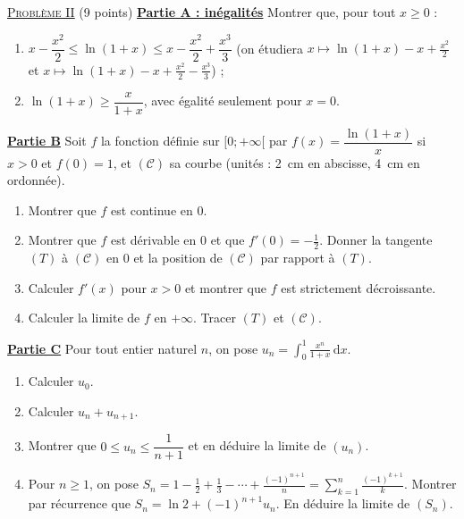 \noindent \underline{\textsc{Probl\`eme II}} (9 points) \newline
\underline{\textbf{Partie A : in\'egalit\'es}} \newline
Montrer que, pour tout $x \geq 0$ :
\begin{enumerate}
      \item $x - \dfrac{x^2}{2} \leq \ln(1 + x) \leq x - \dfrac{x^2}{2} + \dfrac{x^3}{3}$
            (on \'etudiera $x \mapsto \ln(1+x) - x + \frac{x^2}{2}$ et $x \mapsto \ln(1+x) - x + \frac{x^2}{2} - \frac{x^3}{3}$) ;
      \item $\ln(1 + x) \geq \dfrac{x}{1 + x}$, avec \'egalit\'e seulement pour $x = 0$.
\end{enumerate}
\underline{\textbf{Partie B}} \newline
Soit $f$ la fonction d\'efinie sur $[0 ; +\infty[$ par $f(x) = \dfrac{\ln(1 + x)}{x}$ si $x > 0$ et $f(0) = 1$, et $(\mathscr{C})$ sa courbe
(unit\'es : 2~cm en abscisse, 4~cm en ordonn\'ee).
\begin{enumerate}
      \item Montrer que $f$ est continue en $0$.
      \item Montrer que $f$ est d\'erivable en $0$ et que $f'(0) = -\frac{1}{2}$. Donner la tangente $(T)$ \`a $(\mathscr{C})$ en $0$
            et la position de $(\mathscr{C})$ par rapport \`a $(T)$.
      \item Calculer $f'(x)$ pour $x > 0$ et montrer que $f$ est strictement d\'ecroissante.
      \item Calculer la limite de $f$ en $+\infty$. Tracer $(T)$ et $(\mathscr{C})$.
\end{enumerate}
\underline{\textbf{Partie C}} \newline
Pour tout entier naturel $n$, on pose $u_n = \displaystyle\int_0^1 \frac{x^n}{1 + x}\,\mathrm{d}x$.
\begin{enumerate}
      \item Calculer $u_0$.
      \item Calculer $u_n + u_{n+1}$.
      \item Montrer que $0 \leq u_n \leq \dfrac{1}{n+1}$ et en d\'eduire la limite de $(u_n)$.
      \item Pour $n \geq 1$, on pose $S_n = 1 - \frac{1}{2} + \frac{1}{3} - \cdots + \frac{(-1)^{n+1}}{n} = \displaystyle\sum_{k=1}^{n} \frac{(-1)^{k+1}}{k}$.
            Montrer par r\'ecurrence que $S_n = \ln 2 + (-1)^{n+1} u_n$. En d\'eduire la limite de $(S_n)$.
\end{enumerate}


